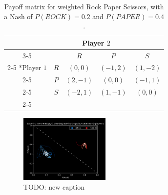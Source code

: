 \documentclass[conference]{IEEEtran}
\newcommand\TODO[1]{{\color{red}TODO: #1}}
\begin{document}


\begin{table}
    \centering
    \setlength{\extrarowheight}{2pt}
    \begin{tabular}{*{5}{c|}}
      \multicolumn{2}{c}{} & \multicolumn{2}{c}{Player $2$}\\\cline{3-5}
      \multicolumn{1}{c}{} &  & $R$  & $P$ & $S$ \\\cline{2-5}
      \multirow{2}*{Player $1$}  & $R$ & $(0,0)$ & $(-1,2)$ & $(1,-2)$ \\\cline{2-5}
      & $P$ & $(2,-1)$ & $(0,0)$ & $(-1,1)$ \\\cline{2-5}
      & $S$ & $(-2,1)$ & $(1,-1)$ & $(0,0)$ \\\cline{2-5}
    \end{tabular}
    \caption{Payoff matrix for weighted Rock Paper Scissors, with a Nash of $P(ROCK)=0.2$ and $P(PAPER)=0.4$.}
    \label{tab:weighted-rps}
\end{table}

\begin{figure}
    \centering
    \includegraphics[width=12em]{Figures/weighted-rps-ppo-e4.png}
    \caption{\TODO{new caption}}
    \label{fig:rps-ppo-e2}
\end{figure}
\end{document}

